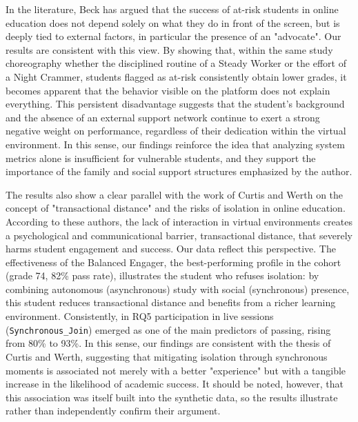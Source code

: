 In the literature, Beck has argued that the success of at-risk students in online education does not depend solely on what they do in front of the screen, but is deeply tied to external factors, in particular the presence of an "advocate". Our results are consistent with this view. By showing that, within the same study choreography whether the disciplined routine of a Steady Worker or the effort of a Night Crammer, students flagged as at-risk consistently obtain lower grades, it becomes apparent that the behavior visible on the platform does not explain everything. This persistent disadvantage suggests that the student's background and the absence of an external support network continue to exert a strong negative weight on performance, regardless of their dedication within the virtual environment. In this sense, our findings reinforce the idea that analyzing system metrics alone is insufficient for vulnerable students, and they support the importance of the family and social support structures emphasized by the author.

The results also show a clear parallel with the work of Curtis and Werth on the concept of "transactional distance" and the risks of isolation in online education. According to these authors, the lack of interaction in virtual environments creates a psychological and communicational barrier, transactional distance, that severely harms student engagement and success. Our data reflect this perspective. The effectiveness of the Balanced Engager, the best-performing profile in the cohort (grade 74, 82\% pass rate), illustrates the student who refuses isolation: by combining autonomous (asynchronous) study with social (synchronous) presence, this student reduces transactional distance and benefits from a richer learning environment. Consistently, in RQ5 participation in live sessions (\texttt{Synchronous\_Join}) emerged as one of the main predictors of passing, rising from 80\% to 93\%. In this sense, our findings are consistent with the thesis of Curtis and Werth, suggesting that mitigating isolation through synchronous moments is associated not merely with a better "experience" but with a tangible increase in the likelihood of academic success. It should be noted, however, that this association was itself built into the synthetic data, so the results illustrate rather than independently confirm their argument.

